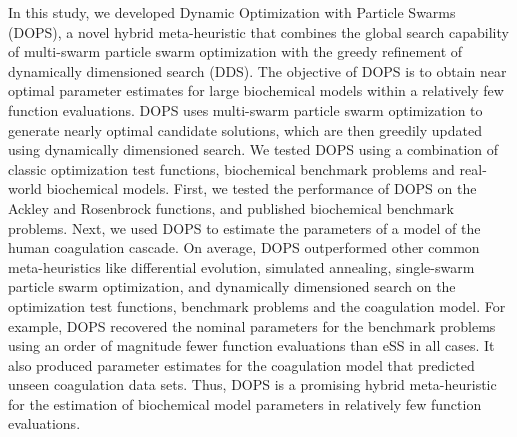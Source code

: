 \documentclass[12pt]{article}
\begin{document}

In this study, we developed Dynamic Optimization with Particle Swarms (DOPS), a novel hybrid meta-heuristic that combines the global search capability of multi-swarm particle swarm optimization with the greedy refinement of dynamically dimensioned search (DDS).
The objective of DOPS is to obtain near optimal parameter estimates for large biochemical models within a relatively few function evaluations.
DOPS uses multi-swarm particle swarm optimization to generate nearly optimal candidate solutions, which are then greedily updated using dynamically dimensioned search.
We tested DOPS using a combination of classic optimization test functions, biochemical benchmark problems and real-world biochemical models.
First, we tested the performance of DOPS on the Ackley and Rosenbrock functions, and published biochemical benchmark problems.
Next, we used DOPS to estimate the parameters of a model of the human coagulation cascade.
On average, DOPS outperformed other common meta-heuristics like differential evolution, simulated annealing, single-swarm particle swarm optimization, and dynamically dimensioned search on the optimization test functions, benchmark problems and the coagulation model. For example, DOPS recovered the nominal parameters for the benchmark problems using an order of magnitude fewer function evaluations than eSS in all cases.
It also produced parameter estimates for the coagulation model that predicted unseen coagulation data sets.
Thus, DOPS is a promising hybrid meta-heuristic for the estimation of biochemical model parameters in relatively few function evaluations.
\end{document}
